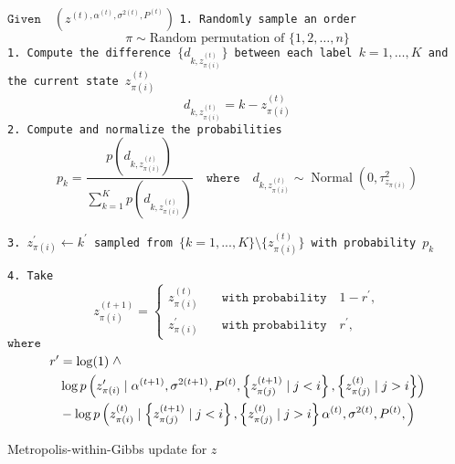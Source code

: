 \documentclass[11pt]{amsart}
\newcommand{\vertg}{\rotatebox{90}{$>$}}
\begin{document}
\begin{algorithm}
\begin{algorithmic}[t]
\State $\texttt{Given} \quad \left(z^{(t),\alpha^{(t)},\sigma^{2(t)},P^{(t)}}\right)  $
\State
\State \texttt{1. Randomly sample an order} \begin{equation}\label{eqn_random_order}
\pi \sim \text{Random permutation of } \{1,2,\ldots,n\} \nonumber
\end{equation}
    \State \texttt{1. Compute the difference $\{d_{k,z_{\pi(i)}^{(t)}}\}$ between each label $k=1,\ldots,K$ and the current state $z_{\pi(i)}^{(t)}$}
    \begin{equation}\label{eqn:actual_proposal}
d_{k,z_{\pi(i)}^{(t)}} =  k - z_{\pi(i)}^{(t)}  \nonumber
\end{equation}
    \State \texttt{2. Compute and normalize the probabilities}
    \begin{equation}\label{eqn:adjusted_probabilities}
p_{k} = \frac{p \left( d_{k,z_{\pi(i)}^{(t)}} \right) }{\sum_{k=1}^Kp \left( d_{k,z_{\pi(i)}^{(t)}} \right) }  \quad \texttt{where} \quad d_{k,z_{\pi(i)}^{(t)}} \sim \operatorname{Normal}\left( 0, \tau^2_{z_{\pi(i)}} \right) \nonumber
\end{equation}
    
    \State \texttt{3. $z^{\prime}_{\pi(i)} \gets k^{\prime}$ sampled from $\{ k = 1,...,K \} \setminus \{ z_{\pi(i)}^{(t)} \}$ with probability $p_k$} 

    
    \State \texttt{4. Take} \begin{equation}\label{eqn_acc_reject_z}
    z^{(t+1)}_{\pi(i)} = 
    \begin{cases}
    z^{(t)}_{\pi(i)} \quad &\texttt{with probability} \quad 1 - r^\prime, \\
    z^{\prime}_{\pi(i)} \quad &\texttt{with probability} \quad r^\prime,
    \end{cases}\nonumber
    \end{equation}
    \State $\texttt{where}$ \begin{align}\label{eqn:z_ratio}
    r^\prime &= \log(1) \ \vertg \nonumber \\ 
    &\log{p \left(z^{\prime}_{\pi(i)} \mid \alpha^{(t+1)},\sigma^{2(t+1)},P^{(t)}, \left\{ z_{\pi(j)}^{(t+1)} \mid j < i \right\} , \left\{ z_{\pi(j)}^{(t)} \mid j > i \right\} \right)}    \\ 
    &- \log{p \left(z^{(t)}_{\pi(i)} \mid \left\{ z_{\pi(j)}^{(t+1)} \mid j < i \right\}, \left\{ z_{\pi(j)}^{(t)} \mid j > i \right\} \alpha^{(t)},\sigma^{2(t)},P^{(t)},  \right)}  \nonumber
    \end{align}
\EndFor
\end{algorithmic}
\caption{Metropolis-within-Gibbs update for \(z\)}
\label{alg_general_algorithm_z}
\end{algorithm}
\end{document}
